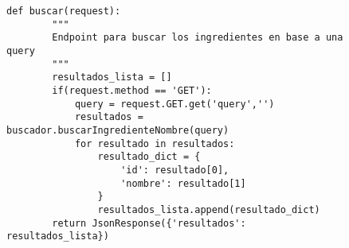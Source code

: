 \begin{figure}[H]
    \begin{lstlisting}[style=consola]
    def buscar(request):
        """
        Endpoint para buscar los ingredientes en base a una query
        """
        resultados_lista = []
        if(request.method == 'GET'):
            query = request.GET.get('query','')
            resultados = buscador.buscarIngredienteNombre(query)
            for resultado in resultados:
                resultado_dict = {
                    'id': resultado[0],
                    'nombre': resultado[1]
                }
                resultados_lista.append(resultado_dict)
        return JsonResponse({'resultados': resultados_lista})
    \end{lstlisting}
    \caption{}
    \label{sni:django-buscar}
\end{figure}

